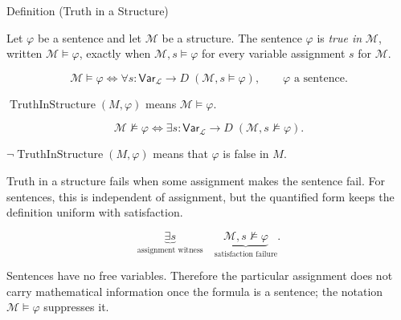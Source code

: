 \begin{definitionbox}{Definition (Truth in a Structure)}
\begin{definition}
\label{def:truth-structure}
Let \(\varphi\) be a sentence and let \(\mathcal M\) be a structure. The
sentence \(\varphi\) is \emph{true in} \(\mathcal M\), written
\(\mathcal M\models\varphi\), exactly when
\(\mathcal M,s\models\varphi\) for every variable assignment \(s\) for
\(\mathcal M\).
\end{definition}
\end{definitionbox}

\begin{remark*}
\[
\mathcal M\models\varphi
\Longleftrightarrow
\forall s:\mathsf{Var}_{\mathcal L}\to D\;(\mathcal M,s\models\varphi),
\qquad
\varphi \text{ a sentence.}
\]
\end{remark*}

\begin{remark*}
\(\operatorname{TruthInStructure}(M,\varphi)\) means
\(\mathcal M\models\varphi\).
\end{remark*}

\begin{remark*}
\[
\mathcal M\not\models\varphi
\Longleftrightarrow
\exists s:\mathsf{Var}_{\mathcal L}\to D\;(\mathcal M,s\not\models\varphi).
\]
\end{remark*}

\begin{remark*}
\(\neg\operatorname{TruthInStructure}(M,\varphi)\) means that \(\varphi\) is
false in \(M\).
\end{remark*}

\begin{remark*}
Truth in a structure fails when some assignment makes the sentence fail. For
sentences, this is independent of assignment, but the quantified form keeps the
definition uniform with satisfaction.
\end{remark*}

\begin{remark*}
\[
\underbrace{\exists s}_{\text{assignment witness}}
\quad
\underbrace{\mathcal M,s\not\models\varphi}_{\text{satisfaction failure}}.
\]
\end{remark*}

\begin{remark*}[Interpretation]
Sentences have no free variables. Therefore the particular assignment does not
carry mathematical information once the formula is a sentence; the notation
\(\mathcal M\models\varphi\) suppresses it.
\end{remark*}

